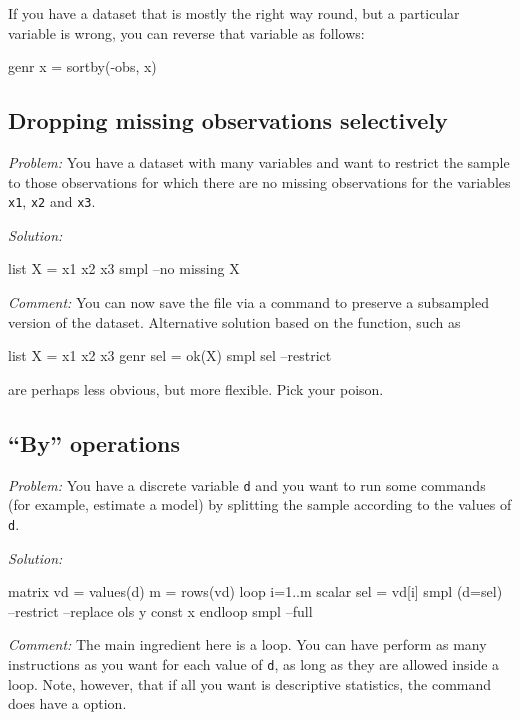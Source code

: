 If you have a dataset that is mostly the right way round, but a
particular variable is wrong, you can reverse that variable as
follows:
\begin{code}
genr x = sortby(-obs, x)
\end{code}


\subsection{Dropping missing observations selectively}

\emph{Problem:} You have a dataset with many variables and want to
restrict the sample to those observations for which there are no
missing observations for the variables \texttt{x1}, \texttt{x2} and
\texttt{x3}.

\begin{samepage}
\emph{Solution:}
\begin{code}
list X = x1 x2 x3
smpl --no missing X
\end{code}
\end{samepage}

\emph{Comment:} You can now save the file via a  command
to preserve a subsampled version of the dataset. Alternative solution
based on the  function, such as
\begin{code}
list X = x1 x2 x3
genr sel = ok(X)
smpl sel --restrict
\end{code}
are perhaps less obvious, but more flexible. Pick your poison.

\subsection{``By'' operations}

\emph{Problem:} You have a discrete variable \texttt{d} and you want
to run some commands (for example, estimate a model) by splitting the
sample according to the values of \texttt{d}.

\emph{Solution:}
\begin{code}
matrix vd = values(d)
m = rows(vd)
loop i=1..m
  scalar sel = vd[i]
  smpl (d=sel) --restrict --replace
  ols y const x
endloop
smpl --full
\end{code}

\emph{Comment:} The main ingredient here is a loop.  You can have
 perform as many instructions as you want for each value of
\texttt{d}, as long as they are allowed inside a loop. Note, however,
that if all you want is descriptive statistics, the 
command does have a  option.

